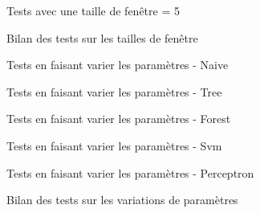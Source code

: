 \documentclass[11pt]{rapport-tp-ia}
\begin{document}
\begin{appendices}
\begin{figure}[ht]
		\label{fig:window2}
	\end{figure}
		   
	\begin{figure}[ht]
		\centering
		\caption{Tests avec une taille de fenêtre = 5}
				
		\label{fig:window5}
	\end{figure}
		
	\begin{figure}[ht]
		\centering
		\caption{Bilan des tests sur les tailles de fenêtre}
				
		\label{fig:bilanwindow}
	\end{figure}
	\begin{figure}[ht]
		\centering
		\caption{Tests en faisant varier les paramètres - Naive}
				
		\label{fig:paramsNaive}
	\end{figure}
	\begin{figure}[ht]
		\centering
		\caption{Tests en faisant varier les paramètres - Tree}
				
		\label{fig:paramsTree}
	\end{figure}
	\begin{figure}[ht]
		\centering
		\caption{Tests en faisant varier les paramètres - Forest}
				
		\label{fig:paramsForest}
	\end{figure}
	\begin{figure}[ht]
		\centering
		\caption{Tests en faisant varier les paramètres - Svm}
				
		\label{fig:paramsSvm}
	\end{figure}
	\begin{figure}[ht]
		\centering
		\caption{Tests en faisant varier les paramètres - Perceptron}
				
		\label{fig:paramsPerceptron}
	\end{figure}
	\begin{figure}[ht]
		\centering
		\caption{Bilan des tests sur les variations de paramètres}
				

\end{figure}
\end{appendices}
\end{document}

